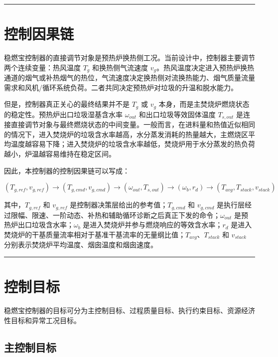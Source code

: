 \documentclass[UTF8,openany,zihao=-4,oneside]{ctexbook}
\newcommand{\manualdivider}{\par\vspace{0.6em}\noindent\textcolor{FGLine}{\rule{\linewidth}{0.7pt}}\vspace{0.6em}\par}
\begin{document}
\manualdivider

\section{控制因果链}\label{sec:direct-and-indirect-control}

稳燃宝控制器的直接调节对象是预热炉换热侧工况。当前设计中，控制器主要调节两个连续变量：热风温度 \(T_g\) 和换热侧气流速度 \(v_g\)。热风温度决定进入预热炉换热通道的烟气或补热烟气的热位，气流速度决定换热侧对流换热能力、烟气质量流量需求和风机/循环系统负荷。二者共同决定预热炉对垃圾的升温和脱水能力。

但是，控制器真正关心的最终结果并不是 \(T_g\) 或 \(v_g\) 本身，而是主焚烧炉燃烧状态的稳定性。预热炉出口垃圾湿基含水率 \(\omega_{out}\) 和出口垃圾等效固体温度 \(T_{s,out}\) 是连接直接调节对象与最终燃烧状态的中间变量。一般而言，在进料量和热值近似相同的情况下，进入焚烧炉的垃圾含水率越高，水分蒸发消耗的热量越大，主燃烧区平均温度越容易下降；进入焚烧炉的垃圾含水率越低，焚烧炉用于水分蒸发的热负荷越小，炉温越容易维持在稳定区间。

因此，本控制器的控制因果链可以写成：

\[
\left(T_{g,ref},v_{g,ref}\right)
\longrightarrow
\left(T_{g,cmd},v_{g,cmd}\right)
\longrightarrow
\left(\omega_{out},T_{s,out}\right)
\longrightarrow
\left(\omega_b,r_d\right)
\longrightarrow
\left(T_{avg},T_{stack},v_{stack}\right)
\]

其中，\(T_{g,ref}\) 和 \(v_{g,ref}\) 是控制器决策层给出的参考值；\(T_{g,cmd}\) 和 \(v_{g,cmd}\) 是执行层经过限幅、限速、一阶动态、补热和辅助循环诊断之后真正下发的命令；\(\omega_{out}\) 是预热炉出口垃圾含水率；\(\omega_b\) 是进入焚烧炉并参与燃烧响应的等效含水率；\(r_d\) 是进入焚烧炉的干基质量流率相对于基准干基流率的无量纲比值；\(T_{avg}\)、\(T_{stack}\) 和 \(v_{stack}\) 分别表示焚烧炉平均温度、烟囱温度和烟囱速度。

\manualdivider

\section{控制目标}\label{sec:control-objectives}

稳燃宝控制器的目标可分为主控制目标、过程质量目标、执行约束目标、资源经济性目标和异常工况目标。

\subsection{主控制目标}\label{subsec:main-objective}
\end{document}
